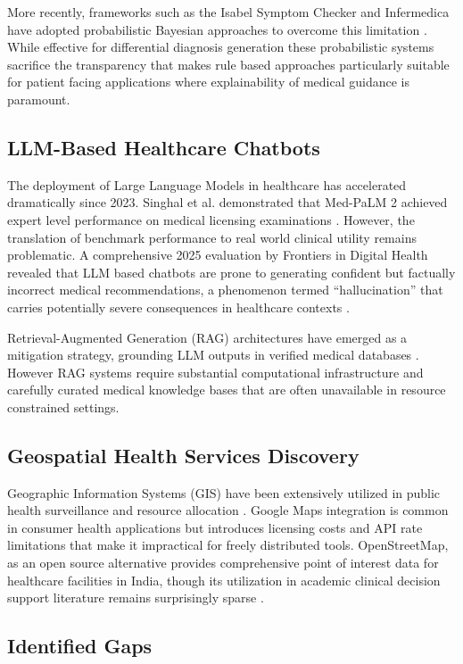 \documentclass[conference]{IEEEtran}
\begin{document}
More recently, frameworks such as the Isabel Symptom Checker and Infermedica have adopted probabilistic Bayesian approaches to overcome this limitation \cite{b9}. While effective for differential diagnosis generation these probabilistic systems sacrifice the transparency that makes rule based approaches particularly suitable for patient facing applications where explainability of medical guidance is paramount.

\subsection{LLM-Based Healthcare Chatbots}

The deployment of Large Language Models in healthcare has accelerated dramatically since 2023. Singhal et al. demonstrated that Med-PaLM 2 achieved expert level performance on medical licensing examinations \cite{b10}. However, the translation of benchmark performance to real world clinical utility remains problematic. A comprehensive 2025 evaluation by Frontiers in Digital Health revealed that LLM based chatbots are prone to generating confident but factually incorrect medical recommendations, a phenomenon termed ``hallucination'' that carries potentially severe consequences in healthcare contexts \cite{b11}.

Retrieval-Augmented Generation (RAG) architectures have emerged as a mitigation strategy, grounding LLM outputs in verified medical databases \cite{b12}. However RAG systems require substantial computational infrastructure and carefully curated medical knowledge bases that are often unavailable in resource constrained settings.

\subsection{Geospatial Health Services Discovery}

Geographic Information Systems (GIS) have been extensively utilized in public health surveillance and resource allocation \cite{b13}. Google Maps integration is common in consumer health applications but introduces licensing costs and API rate limitations that make it impractical for freely distributed tools. OpenStreetMap, as an open source alternative provides comprehensive point of interest data for healthcare facilities in India, though its utilization in academic clinical decision support literature remains surprisingly sparse \cite{b14}.

\subsection{Identified Gaps}
\end{document}
